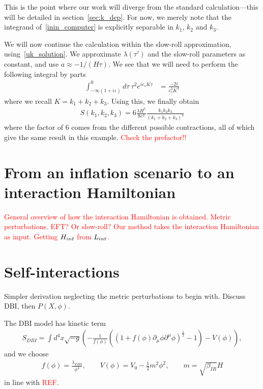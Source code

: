 This is the point where our work will diverge from the standard calculation---this
will be detailed in section~\ref{sec:k_dep}. For now, we merely note that
the integrand of~\eqref{inin_computer} is explicitly separable in $k_1$, $k_2$ and $k_3$.


We will now continue the calculation within the slow-roll approximation,
using~\eqref{uk_solution}. We approximate $\lambda(\tau')$ and the slow-roll
parameters as constant, and use $a\approx-1/(H\tau)$.
We see that we will need to perform the following integral by parts
\begin{align}
    \int_{-\infty(1+i\varepsilon)}^{0}d\tau~\tau^2 e^{ic_sK\tau}
    &= \frac{-2i}{c_s^3K^3}
\end{align}
where we recall $K=k_1+k_2+k_3$.
Using this, we finally obtain
\begin{align}
    S(k_1, k_2, k_3) = 6\frac{\lambda H^5}{8\varepsilon^3}\frac{k_1k_2k_3}{(k_1+k_2+k_3)^3}
\end{align}
where the factor of $6$ comes from the different possible contractions, all
of which give the same result in this example.
\textcolor{red}{Check the prefactor!!}


    \section{From an inflation scenario to an interaction Hamiltonian}
    \textcolor{red}{
    General overview of how the interaction Hamiltonian is obtained.
    Metric perturbations.
    EFT? Or slow-roll? Our method takes the interaction Hamiltonian
    as input. Getting $H_{int}$ from $L_{int}$.}
    \section{Self-interactions}\label{sec:interactions}
    Simpler derivation neglecting the metric perturbations to begin with.
    Discuss DBI, then $P(X, \phi)$.


    The DBI model has kinetic term
\begin{align}\label{eq:dbi_action}
    S_{DBI}=\int d^4x\sqrt{-g}\left(-\frac{1}{f(\phi)}\left(\left(1+f(\phi)\partial_\mu\phi\partial^\mu\phi\right)^{\frac{1}{2}}-1\right)-V(\phi)\right),
\end{align}
and we choose
\begin{align}\label{eq:dbi_warp}
    f(\phi)=\frac{\lambda_{DBI}}{\phi^4},\qquad
    V(\phi)=V_0-\frac{1}{2}m^2\phi^2,\qquad
    m=\sqrt{\beta_{IR}}H
\end{align}
in line with \textcolor{red}{REF}.

